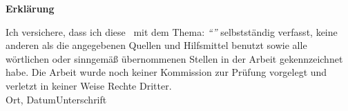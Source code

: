 \newpage
\thispagestyle{empty}
\begin{framed}
\begin{center}
\Large\bfseries Erklärung
\end{center}
\medskip
\noindent
Ich versichere, dass ich diese \Was ~mit dem Thema:
\textit{\enquote{\Titel}}
selbstständig verfasst, keine anderen als die angegebenen Quellen und Hilfsmittel benutzt sowie alle wörtlichen oder sinngemäß übernommenen Stellen in der Arbeit gekennzeichnet habe. 
Die Arbeit wurde noch keiner Kommission zur Prüfung vorgelegt und verletzt in keiner Weise Rechte Dritter.
\vspace{3cm}
\noindent
\underline{\hspace{0cm}}\hfill\underline{\hspace{15cm}}\\
Ort, Datum\hfill Unterschrift\hspace{4cm}
\end{framed}

\endinput
